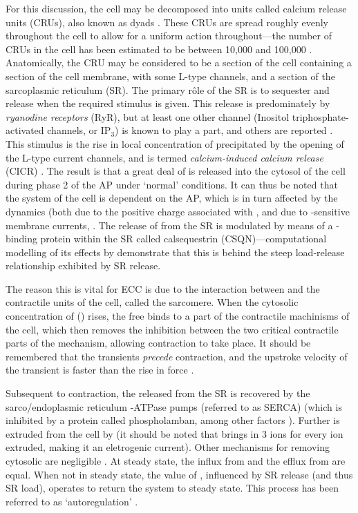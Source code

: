 \documentclass[../thesis-main.tex]{subfiles}
\begin{document}
For this discussion, the cell may be decomposed into units called calcium release units (CRUs), also known as dyads \citep{Cleemann1998}. These CRUs are spread roughly evenly throughout the cell to allow for a uniform action throughout---the number of CRUs in the cell has been estimated to be between 10,000 and 100,000 \citep{Cleemann1998,Greenstein2002}. Anatomically, the CRU may be considered to be a section of the cell containing a section of the cell membrane, with some L-type \ca{} channels, and a section of the sarcoplasmic reticulum (SR). The primary r\^ole of the SR is to sequester and release \ca{} when the required stimulus is given. This release is predominately by \emph{ryanodine receptors} (RyR), but at least one other channel (Inositol triphosphate-activated channels, or IP$_3$) is known to play a part, and others are reported \citep{Pozzan1994}. This stimulus is the rise in local concentration of \ca{} precipitated by the opening of the L-type \ca{} current channels, and is termed \emph{calcium-induced calcium release} (CICR) \citep{Fabiato1992}. The result is that a great deal of \ca{} is released into the cytosol of the cell during phase 2 of the AP under `normal' conditions. It can thus be noted that the \ca{} system of the cell is dependent on the AP, which is in turn affected by the \ca{} dynamics (both due to the positive charge associated with \ca{}, and due to \ca{}-sensitive membrane currents, \eg{} \ica{} \citep{Weiss2006}. The release of \ca{} from the SR is modulated by means of a \ca{}-binding protein within the SR called calsequestrin (CSQN)---computational modelling of its effects by \citet{Restrepo2008} demonstrate that this is behind the steep load-release relationship exhibited by SR release.

The reason this is vital for ECC is due to the interaction between \ca{} and the contractile units of the cell, called the sarcomere. When the cytosolic concentration of \ca{} (\cai{}) rises, the free \ca{} binds to a part of the contractile machinisms of the cell, which then removes the inhibition between the two critical contractile parts of the mechanism, allowing contraction to take place. It should be remembered that the \ca{} transients \emph{precede} contraction, and the upstroke velocity of the transient is faster than the rise in force \citep{Lee1988}.

Subsequent to contraction, the \ca{} released from the SR is recovered by the sarco/endoplasmic reticulum \ca{}-ATPase pumps (referred to as SERCA) \citep{Franzini-Armstrong2005} (which is inhibited by a protein called phospholamban, among other factors \citep{Talukder2009, Xu1993, Eisner2000}). Further \ca{} is extruded from the cell by \inaca{} \citep{Laurita2008} (it should be noted that \inaca{} brings in 3 \na{} ions for every \ca{} ion extruded, making it an eletrogenic current). Other mechanisms for removing cytosolic \ca{} are negligible \citep{Bassani1994}. At steady state, the influx from \ica{} and the efflux from \inaca{} are equal. When not in steady state, the value of \cai{}, influenced by SR \ca{} release (and thus SR \ca{} load), operates to return the system to steady state. This process has been referred to as `autoregulation' \citep{Eisner2000}.
\end{document}
